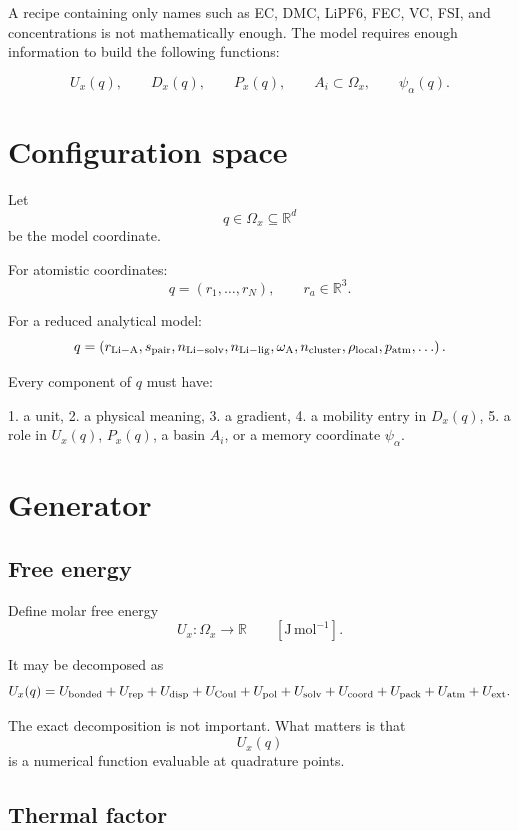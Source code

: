 \documentclass[11pt]{article}
\newcommand{\R}{\mathbb R}
\begin{document}
  A recipe containing only names such as EC, DMC, LiPF6, FEC, VC, FSI, and
  concentrations is not mathematically enough. The model requires enough
  information to build the following functions:

  \[
  U_x(q),
  \qquad
  D_x(q),
  \qquad
  P_x(q),
  \qquad
  A_i\subset\Omega_x,
  \qquad
  \psi_\alpha(q).
  \]

  \section{Configuration space}

  Let
  \[
  q\in\Omega_x\subseteq\R^d
  \]
  be the model coordinate.

  For atomistic coordinates:
  \[
  q=(r_1,\ldots,r_N),
  \qquad
  r_a\in\R^3.
  \]

  For a reduced analytical model:
  \[
  q=
  \left(
  r_{\rm Li-A},
  s_{\rm pair},
  n_{\rm Li-solv},
  n_{\rm Li-lig},
  \omega_{\rm A},
  n_{\rm cluster},
  \rho_{\rm local},
  p_{\rm atm},
  \ldots
  \right).
  \]

  Every component of \(q\) must have:

  1. a unit,
  2. a physical meaning,
  3. a gradient,
  4. a mobility entry in \(D_x(q)\),
  5. a role in \(U_x(q)\), \(P_x(q)\), a basin \(A_i\), or a memory coordinate
  \(\psi_\alpha\).

  \section{Generator}

  \subsection{Free energy}

  Define molar free energy
  \[
  U_x:\Omega_x\to\R
  \qquad [\mathrm{J\,mol^{-1}}].
  \]

  It may be decomposed as
  \[
  U_x(q)
  =
  U_{\rm bonded}
  +
  U_{\rm rep}
  +
  U_{\rm disp}
  +
  U_{\rm Coul}
  +
  U_{\rm pol}
  +
  U_{\rm solv}
  +
  U_{\rm coord}
  +
  U_{\rm pack}
  +
  U_{\rm atm}
  +
  U_{\rm ext}.
  \]

  The exact decomposition is not important. What matters is that
  \[
  U_x(q)
  \]
  is a numerical function evaluable at quadrature points.

  \subsection{Thermal factor}
\end{document}
